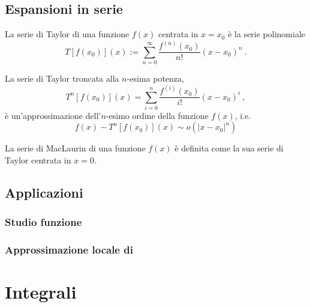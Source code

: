 \section{Espansioni in serie}
\begin{definition} La serie di Taylor di una funzione $f(x)$ centrata in $x=x_0$ è la serie polinomiale
\begin{equation}
   T[f(x_0)](x) := \sum_{n=0}^{\infty} \dfrac{f^{(n)}(x_0)}{n!} (x-x_0)^n \ .
\end{equation}
\end{definition}
%
\begin{theorem}
La serie di Taylor troncata alla $n$-esima potenza,
\begin{equation}
  T^n[f(x_0)](x) = \sum_{i=0}^{n} \dfrac{f^{(i)}(x_0)}{i!} (x-x_0)^i \ ,
\end{equation}
è un'approssimazione dell'$n$-esimo ordine della funzione $f(x)$, i.e.
\begin{equation}
  f(x) - T^n[f(x_0)](x) \sim o(|x-x_0|^{n})
\end{equation}
\end{theorem}

\begin{definition} La serie di MacLaurin di una funzione $f(x)$ è definita come la sua serie di Taylor centrata in $x=0$.
\end{definition}

\section{Applicazioni}
\subsection{Studio funzione}

\subsection{Approssimazione locale di }

\chapter{Integrali}

\begin{theorem}
\end{theorem}
